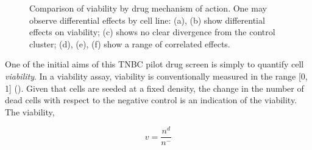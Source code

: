 \begin{figure}
    \qquad
    \qquad
\caption{Comparison of viability by drug mechanism of action. One may observe differential effects by cell line: (a), (b) show differential effects on viability; (c) shows no clear divergence from the control cluster; (d), (e), (f) show a range of correlated effects.}
\label{fig:viability_moas}
\end{figure}

One of the initial aims of this TNBC pilot drug screen is simply to quantify cell \emph{viability}. In a viability assay, viability is conventionally measured in the range [0, 1] (\cite{pegg1989viability}). Given that cells are seeded at a fixed density, the change in the number of dead cells with respect to the negative control is an indication of the viability. The viability,

\begin{equation}
v = \frac{n^d}{n^-}
\end{equation}

